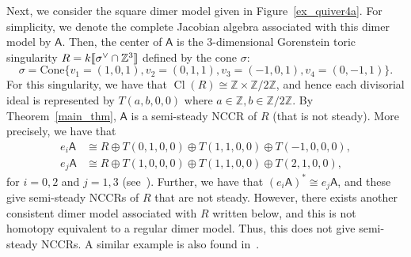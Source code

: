 \documentclass[ALCO,ThmDefs,Unicode]{cedram}
\newcommand{\ZZ}{\mathbb{Z}}
\newcommand{\sfA}{\mathsf{A}}
\DeclareMathOperator{\Cl}{Cl}
\newcommand{\llbracket}{\mathopen{[\mkern -2.7mu[}}
\newcommand{\rrbracket}{\mathclose{]\mkern -2.7mu]}}
\begin{document}
\begin{exem}\label{ex_semisteady}
Next, we consider the square dimer model given in Figure~\ref{ex_quiver4a}. For simplicity, we denote the complete Jacobian algebra associated with this dimer model by $\sfA$. Then, the center of $\sfA$ is the $3$-dimensional Gorenstein toric singularity $R=k\llbracket \sigma^\vee\cap\ZZ^3\rrbracket $ defined by the cone $\sigma$:
\[
\sigma=\mathrm{Cone}\{v_1=(1,0,1), v_2=(0,1,1), v_3=(-1,0,1), v_4=(0,-1,1) \}.
\]
For this singularity, we have that $\Cl(R)\cong\ZZ\times\ZZ/2\ZZ$, and hence each divisorial ideal is represented by $T(a,b,0,0)$ where $a\in\ZZ, b\in\ZZ/2\ZZ$. By Theorem~\ref{main_thm}, $\sfA$ is a semi-steady NCCR of $R$ (that is not steady). More precisely, we have that
\begin{align*}
e_i\sfA&\cong R\oplus T(0,1,0,0)\oplus T(1,1,0,0)\oplus T(-1,0,0,0), \\
e_j\sfA&\cong R\oplus T(1,0,0,0)\oplus T(1,1,0,0)\oplus T(2,1,0,0), 
\end{align*} 
for $i=0,2$ and $j=1,3$ (see~\cite[Subsection~5.2]{Nak}). Further, we have that $(e_i\sfA)^*\cong e_j\sfA$, and these give semi-steady NCCRs of $R$ that are not steady. However, there exists another consistent dimer model associated with $R$ written below, and this is not homotopy equivalent to a regular dimer model. Thus, this does not give semi-steady NCCRs. A similar example is also found in~\cite[Subsection~5.11]{Nak}.




\begin{center}
{}
\end{center}
\end{exem}
\end{document}
